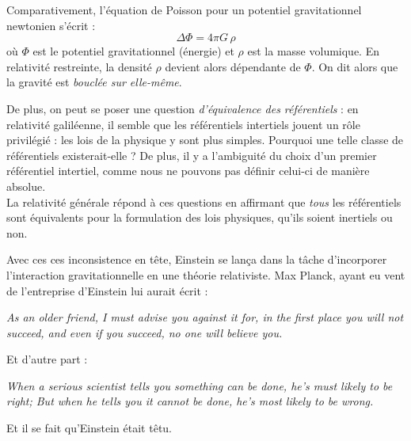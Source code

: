 \begin{enumerate}
    Comparativement, l'équation de Poisson pour un potentiel gravitationnel newtonien s'écrit : 
    \begin{equation}
        \Delta \Phi = 4\pi G \,\rho
    \end{equation}
    où $\Phi$ est le potentiel gravitationnel (énergie) et $\rho$ est la masse volumique. En relativité restreinte, la densité $\rho$ devient alors dépendante de $\Phi$. On dit alors que la gravité est \emph{bouclée sur elle-même}.
 \end{enumerate}
 De plus, on peut se poser une question \emph{d'équivalence des référentiels} : en relativité galiléenne, il semble que les référentiels intertiels jouent un rôle privilégié : les lois de la physique y sont plus simples. Pourquoi une telle classe de référentiels existerait-elle ? De plus, il y a l'ambiguité du choix d'un premier référentiel intertiel, comme nous ne pouvons pas définir celui-ci de manière absolue. \\
 La relativité générale répond à ces questions en affirmant que \emph{tous} les référentiels sont équivalents pour la formulation des lois physiques, qu'ils soient inertiels ou non.

Avec ces ces inconsistence en tête, Einstein se lança dans la tâche d'incorporer l'interaction gravitationnelle en une théorie relativiste. Max Planck, ayant eu vent de l'entreprise d'Einstein lui aurait écrit :
\begin{center}
    \textit{As an older friend, I must advise you against it for, in the first place you will not succeed, and even if you succeed, no one will believe you.}
\end{center}
Et d'autre part :
\begin{center}
    \textit{When a serious scientist tells you something can be done, he's must likely to be right; But when he tells you it cannot be done, he's most likely to be wrong.}
\end{center}
Et il se fait qu'Einstein était têtu.
